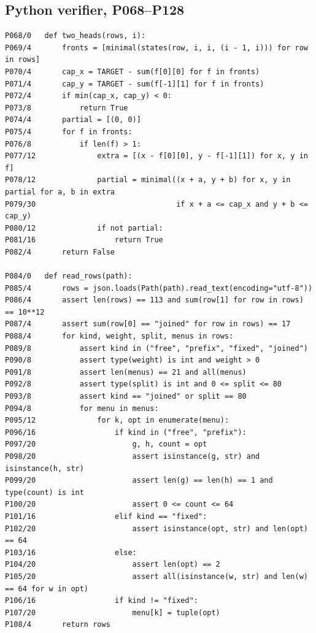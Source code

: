 \documentclass[11pt,letterpaper]{article}
\theoremstyle{cleanthm}
\begin{document}
\clearpage
{}
\subsection*{Python verifier, P068--P128}
\begin{Verbatim}[fontsize=\fontsize{8.3pt}{9.6pt}\selectfont]
P068/0   def two_heads(rows, i):
P069/4       fronts = [minimal(states(row, i, i, (i - 1, i))) for row in rows]
P070/4       cap_x = TARGET - sum(f[0][0] for f in fronts)
P071/4       cap_y = TARGET - sum(f[-1][1] for f in fronts)
P072/4       if min(cap_x, cap_y) < 0:
P073/8           return True
P074/4       partial = [(0, 0)]
P075/4       for f in fronts:
P076/8           if len(f) > 1:
P077/12              extra = [(x - f[0][0], y - f[-1][1]) for x, y in f]
P078/12              partial = minimal((x + a, y + b) for x, y in partial for a, b in extra
P079/30                                if x + a <= cap_x and y + b <= cap_y)
P080/12              if not partial:
P081/16                  return True
P082/4       return False

P084/0   def read_rows(path):
P085/4       rows = json.loads(Path(path).read_text(encoding="utf-8"))
P086/4       assert len(rows) == 113 and sum(row[1] for row in rows) == 10**12
P087/4       assert sum(row[0] == "joined" for row in rows) == 17
P088/4       for kind, weight, split, menus in rows:
P089/8           assert kind in ("free", "prefix", "fixed", "joined")
P090/8           assert type(weight) is int and weight > 0
P091/8           assert len(menus) == 21 and all(menus)
P092/8           assert type(split) is int and 0 <= split <= 80
P093/8           assert kind == "joined" or split == 80
P094/8           for menu in menus:
P095/12              for k, opt in enumerate(menu):
P096/16                  if kind in ("free", "prefix"):
P097/20                      g, h, count = opt
P098/20                      assert isinstance(g, str) and isinstance(h, str)
P099/20                      assert len(g) == len(h) == 1 and type(count) is int
P100/20                      assert 0 <= count <= 64
P101/16                  elif kind == "fixed":
P102/20                      assert isinstance(opt, str) and len(opt) == 64
P103/16                  else:
P104/20                      assert len(opt) == 2
P105/20                      assert all(isinstance(w, str) and len(w) == 64 for w in opt)
P106/16                  if kind != "fixed":
P107/20                      menu[k] = tuple(opt)
P108/4       return rows


\end{Verbatim}
\end{document}
